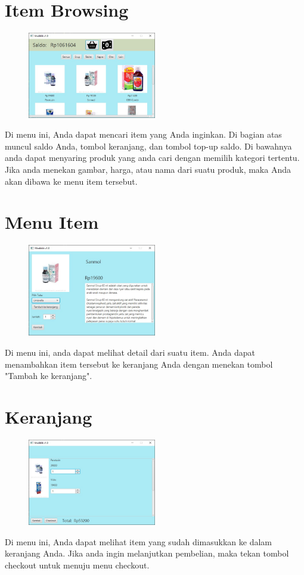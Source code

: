 \documentclass[a4paper]{article}
\begin{document}
\section{Item Browsing}
\begin{figure}[H]
	\centering
	\includegraphics[width=0.5\textwidth]{imgs/mediklik_3.jpg}
\end{figure}
\par Di menu ini, Anda dapat mencari item yang Anda inginkan. Di bagian atas muncul saldo Anda, tombol keranjang, dan tombol top-up saldo. Di bawahnya anda dapat menyaring produk yang anda cari dengan memilih kategori tertentu. Jika anda menekan gambar, harga, atau nama dari suatu produk, maka Anda akan dibawa ke menu item tersebut.
\section{Menu Item}
\begin{figure}[H]
	\centering
	\includegraphics[width=0.5\textwidth]{imgs/mediklik_7.jpg}
\end{figure}
\par Di menu ini, anda dapat melihat detail dari suatu item. Anda dapat menambahkan item tersebut ke keranjang Anda dengan menekan tombol "Tambah ke keranjang".
\section{Keranjang}
\begin{figure}[H]
	\centering
	\includegraphics[width=0.5\textwidth]{imgs/mediklik_4.jpg}
\end{figure}
\par Di menu ini, Anda dapat melihat item yang sudah dimasukkan ke dalam keranjang Anda. Jika anda ingin melanjutkan pembelian, maka tekan tombol checkout untuk menuju menu checkout.
\end{document}
